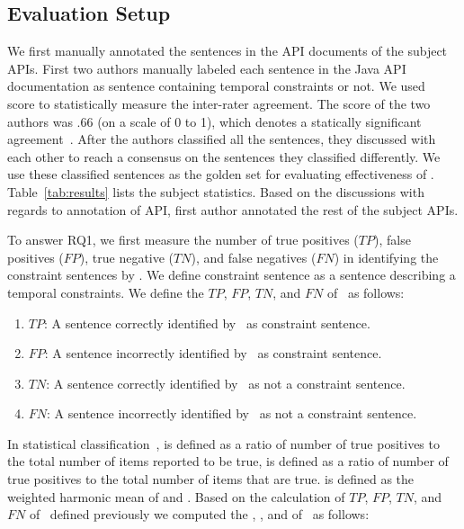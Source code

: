 \subsection{Evaluation Setup} 
We first manually annotated the sentences in the API documents of the subject APIs.
First two authors manually labeled each sentence in the Java API documentation as sentence containing 
temporal constraints or not.
We used ~\cite{carletta1996assessing} score to statistically measure
the inter-rater agreement.
The  score of the two authors was .66 (on a scale of 0 to 1), 
which denotes a statically significant agreement~\cite{carletta1996assessing}. 
After the authors classified all the sentences, they 
discussed with each other to reach a consensus on the sentences they classified differently.
We use these classified sentences as the golden set for evaluating effectiveness of \tool.
Table~\ref{tab:results} lists the subject statistics.
Based on the discussions with regards to annotation of  API, first author annotated the rest of the subject APIs. 



To answer RQ1, we first measure the number of true positives ($TP$), false positives ($FP$), true negative ($TN$), and false negatives ($FN$)
in identifying the constraint sentences by \tool.
We define constraint sentence as a sentence describing a temporal constraints.
We define the $TP$, $FP$, $TN$, and $FN$ of \tool\ as follows:

\begin{enumerate}
	\item $TP$: A sentence correctly identified by \tool\ as constraint sentence.
	\item $FP$: A sentence incorrectly identified by \tool\ as constraint sentence.
	\item $TN$: A sentence correctly identified by \tool\ as not a constraint sentence.
	\item $FN$: A sentence incorrectly identified by \tool\ as not a constraint sentence.
\end{enumerate}


In statistical classification~\cite{Olson08},  is defined as a ratio of
number of true positives to the total number of items reported to be true,
 is defined as a ratio of number of true positives to the total number
of items that are true.  is defined as the weighted harmonic mean of 
 and .
Based on the calculation of $TP$, $FP$, $TN$, and $FN$ of \tool\ defined
previously we computed the , , and  of \tool\ as follows:


